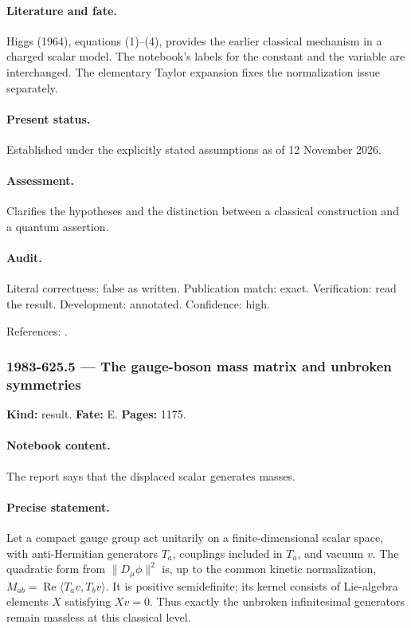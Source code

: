 \paragraph{Literature and fate.} Higgs (1964), equations (1)–(4), provides the earlier classical mechanism in a charged scalar model. The notebook’s labels for the constant and the variable are interchanged. The elementary Taylor expansion fixes the normalization issue separately.

\paragraph{Present status.} Established under the explicitly stated assumptions as of 12 November 2026.

\paragraph{Assessment.} Clarifies the hypotheses and the distinction between a classical construction and a quantum assertion.

\paragraph{Audit.} Literal correctness: false as written. Publication match: exact. Verification: read the result. Development: annotated. Confidence: high.

\noindent References: \citep{higgs1964broken}.\par

\subsubsection{1983-625.5 --- The gauge-boson mass matrix and unbroken symmetries}

\label{item:1983-625.5}

\noindent\textbf{Kind:} result. \textbf{Fate:} E. \textbf{Pages:} 1175.\par

\paragraph{Notebook content.} The report says that the displaced scalar generates masses.

\paragraph{Precise statement.} Let a compact gauge group act unitarily on a finite-dimensional scalar space, with anti-Hermitian generators \(T_a\), couplings included in \(T_a\), and vacuum \(v\). The quadratic form from \(\lVert D_\mu\phi\rVert^2\) is, up to the common kinetic normalization, \(M_{ab}=\operatorname{Re}\langle T_av,T_bv\rangle\). It is positive semidefinite; its kernel consists of Lie-algebra elements \(X\) satisfying \(Xv=0\). Thus exactly the unbroken infinitesimal generators remain massless at this classical level.

